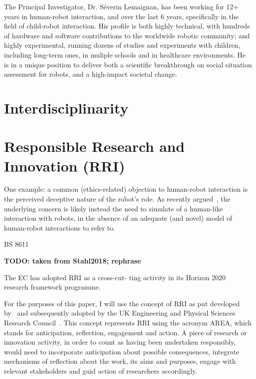 \documentclass[11pt,a4paper]{report}
\newcommand{\TODO}[1]{{\color{red}\textbf{TODO: #1}}}
\begin{document}
The Principal Investigator, Dr.  Séverin Lemaignan, has been working for 12+
years in human-robot interaction, and over the last 6 years, specifically in the
field of child-robot interaction.  His profile is both highly technical, with
hundreds of hardware and software contributions to the worldwide robotic
community; and highly experimental, running dozens of studies and experiments
with children, including long-term ones, in muliple schools and in healthcare
environments. He is in a unique position to deliver both a scientific
breakthrough on social situation assessment for robots, and a high-impact
societal change.

\section{Interdisciplinarity}


\section{Responsible Research and Innovation (RRI)}



One example: a common (ethics-related) objection to human-robot interaction is
the perceived deceptive nature of the robot's role. As recently
argued~\cite{biscontilucidi2018companion}, the underlying concern is likely
instead the need to simulate of a human-like interaction with robots, in the
absence of an adequate (and novel) model of human-robot interactions to refer
to.


BS 8611~\cite{bsi2016robots}
~\cite{stahl2018implementing}


\TODO{taken from Stahl2018; rephrase}

The EC has adopted RRI as a cross-cut-
ting activity in its Horizon 2020 research framework programme.

For the purposes of this paper, I will use the concept of RRI as put developed
by~\cite{stilgoe2013developing} and subsequently adopted by the UK Engineering
and Physical Sciences Research Council~\cite{owen2014uk}. This concept
represents RRI using the acronym AREA, which stands for anticipation,
reflection, engagement and action. A piece of research or innovation activity,
in order to count as having been undertaken responsibly, would need to
incorporate anticipation about possible consequences, integrate mechanisms of
reflection about the work, its aims and purposes, engage with relevant
stakeholders and guid action of researchers accordingly.
\end{document}
